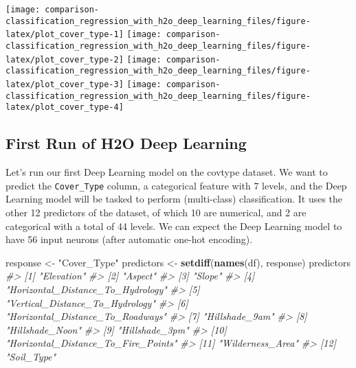 \documentclass[]{book}
\newenvironment{Shaded}{\begin{snugshade}}{\end{snugshade}}
\newcommand{\CommentTok}[1]{\textcolor[rgb]{0.56,0.35,0.01}{\textit{#1}}}
\newcommand{\KeywordTok}[1]{\textcolor[rgb]{0.13,0.29,0.53}{\textbf{#1}}}
\newcommand{\NormalTok}[1]{#1}
\newcommand{\StringTok}[1]{\textcolor[rgb]{0.31,0.60,0.02}{#1}}
\begin{document}
\begin{center}\texttt{[image: comparison-classification\_regression\_with\_h2o\_deep\_learning\_files/figure-latex/plot\_cover\_type-1]} \texttt{[image: comparison-classification\_regression\_with\_h2o\_deep\_learning\_files/figure-latex/plot\_cover\_type-2]} \texttt{[image: comparison-classification\_regression\_with\_h2o\_deep\_learning\_files/figure-latex/plot\_cover\_type-3]} \texttt{[image: comparison-classification\_regression\_with\_h2o\_deep\_learning\_files/figure-latex/plot\_cover\_type-4]} \end{center}

\hypertarget{first-run-of-h2o-deep-learning}{%
\subsection{First Run of H2O Deep Learning}\label{first-run-of-h2o-deep-learning}}

Let's run our first Deep Learning model on the covtype dataset. We want to predict the \texttt{Cover\_Type} column, a categorical feature with 7 levels, and the Deep Learning model will be tasked to perform (multi-class) classification. It uses the other 12 predictors of the dataset, of which 10 are numerical, and 2 are categorical with a total of 44 levels. We can expect the Deep Learning model to have 56 input neurons (after automatic one-hot encoding).

\begin{Shaded}
\begin{Highlighting}[]
\NormalTok{response <-}\StringTok{ "Cover_Type"}
\NormalTok{predictors <-}\StringTok{ }\KeywordTok{setdiff}\NormalTok{(}\KeywordTok{names}\NormalTok{(df), response)}
\NormalTok{predictors}
\CommentTok{#>  [1] "Elevation"                         }
\CommentTok{#>  [2] "Aspect"                            }
\CommentTok{#>  [3] "Slope"                             }
\CommentTok{#>  [4] "Horizontal_Distance_To_Hydrology"  }
\CommentTok{#>  [5] "Vertical_Distance_To_Hydrology"    }
\CommentTok{#>  [6] "Horizontal_Distance_To_Roadways"   }
\CommentTok{#>  [7] "Hillshade_9am"                     }
\CommentTok{#>  [8] "Hillshade_Noon"                    }
\CommentTok{#>  [9] "Hillshade_3pm"                     }
\CommentTok{#> [10] "Horizontal_Distance_To_Fire_Points"}
\CommentTok{#> [11] "Wilderness_Area"                   }
\CommentTok{#> [12] "Soil_Type"}
\end{Highlighting}
\end{Shaded}
\end{document}
